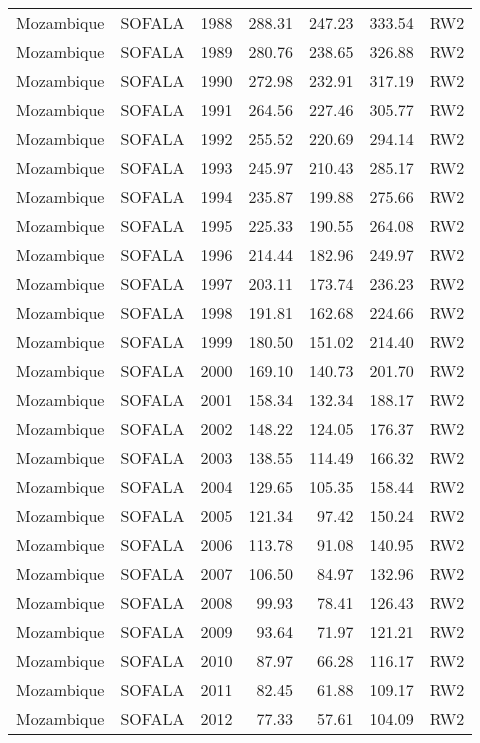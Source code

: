 \begin{longtable}{lllrrrl}
  Mozambique & SOFALA & 1988 & 288.31 & 247.23 & 333.54 & RW2 \\ 
  Mozambique & SOFALA & 1989 & 280.76 & 238.65 & 326.88 & RW2 \\ 
  Mozambique & SOFALA & 1990 & 272.98 & 232.91 & 317.19 & RW2 \\ 
  Mozambique & SOFALA & 1991 & 264.56 & 227.46 & 305.77 & RW2 \\ 
  Mozambique & SOFALA & 1992 & 255.52 & 220.69 & 294.14 & RW2 \\ 
  Mozambique & SOFALA & 1993 & 245.97 & 210.43 & 285.17 & RW2 \\ 
  Mozambique & SOFALA & 1994 & 235.87 & 199.88 & 275.66 & RW2 \\ 
  Mozambique & SOFALA & 1995 & 225.33 & 190.55 & 264.08 & RW2 \\ 
  Mozambique & SOFALA & 1996 & 214.44 & 182.96 & 249.97 & RW2 \\ 
  Mozambique & SOFALA & 1997 & 203.11 & 173.74 & 236.23 & RW2 \\ 
  Mozambique & SOFALA & 1998 & 191.81 & 162.68 & 224.66 & RW2 \\ 
  Mozambique & SOFALA & 1999 & 180.50 & 151.02 & 214.40 & RW2 \\ 
  Mozambique & SOFALA & 2000 & 169.10 & 140.73 & 201.70 & RW2 \\ 
  Mozambique & SOFALA & 2001 & 158.34 & 132.34 & 188.17 & RW2 \\ 
  Mozambique & SOFALA & 2002 & 148.22 & 124.05 & 176.37 & RW2 \\ 
  Mozambique & SOFALA & 2003 & 138.55 & 114.49 & 166.32 & RW2 \\ 
  Mozambique & SOFALA & 2004 & 129.65 & 105.35 & 158.44 & RW2 \\ 
  Mozambique & SOFALA & 2005 & 121.34 & 97.42 & 150.24 & RW2 \\ 
  Mozambique & SOFALA & 2006 & 113.78 & 91.08 & 140.95 & RW2 \\ 
  Mozambique & SOFALA & 2007 & 106.50 & 84.97 & 132.96 & RW2 \\ 
  Mozambique & SOFALA & 2008 & 99.93 & 78.41 & 126.43 & RW2 \\ 
  Mozambique & SOFALA & 2009 & 93.64 & 71.97 & 121.21 & RW2 \\ 
  Mozambique & SOFALA & 2010 & 87.97 & 66.28 & 116.17 & RW2 \\ 
  Mozambique & SOFALA & 2011 & 82.45 & 61.88 & 109.17 & RW2 \\ 
  Mozambique & SOFALA & 2012 & 77.33 & 57.61 & 104.09 & RW2 \\ 

\end{longtable}
